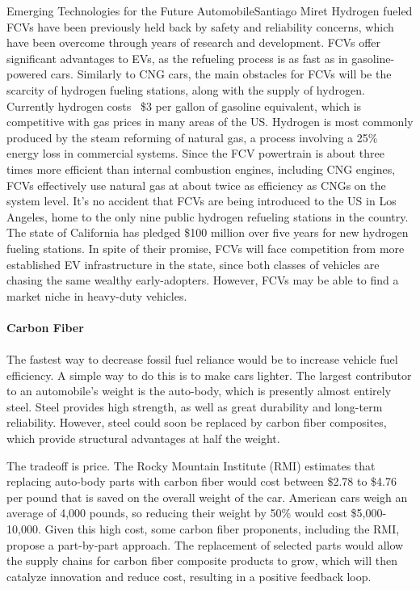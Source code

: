 \documentclass{papertex}
\begin{document}
\begin{news}{2}{Emerging Technologies for the Future Automobile}{Santiago Miret}{}{}
Hydrogen fueled FCVs have been previously held back by safety and reliability
concerns, which have been overcome through years of research and development.
FCVs offer significant advantages to EVs, as the refueling process is as fast as
in gasoline-powered cars. Similarly to CNG cars, the main obstacles for FCVs
will be the scarcity of hydrogen fueling stations, along with the supply of
hydrogen. Currently hydrogen costs ~\$3 per gallon of gasoline equivalent, which
is competitive with gas prices in many areas of the US. Hydrogen is most
commonly produced by the steam reforming of natural gas, a process involving a
25\% energy loss in commercial systems. Since the FCV powertrain is about three
times more efficient than internal combustion engines, including CNG engines,
FCVs effectively use natural gas at about twice as efficiency as CNGs on the
system level. It's no accident that FCVs are being introduced to the US in Los
Angeles, home to the only nine public hydrogen refueling stations in the
country. The state of California has pledged \$100 million over five years for
new hydrogen fueling stations. In spite of their promise, FCVs will face
competition from more established EV infrastructure in the state, since both
classes of vehicles are chasing the same wealthy early-adopters. However, FCVs
may be able to find a market niche in heavy-duty vehicles.
\\
\\
\textbf{Carbon Fiber}
\\
\\
The fastest way to decrease fossil fuel reliance would be to increase vehicle
fuel efficiency. A simple way to do this is to make cars lighter. The largest
contributor to an automobile's weight is the auto-body, which is presently
almost entirely steel. Steel provides high strength, as well as great durability
and long-term reliability. However, steel could soon be replaced by carbon fiber
composites, which provide structural advantages at half the weight.

The tradeoff is price. The Rocky Mountain Institute (RMI) estimates that
replacing auto-body parts with carbon fiber would cost between \$2.78 to \$4.76
per pound that is saved on the overall weight of the car. American cars weigh an
average of 4,000 pounds, so reducing their weight by 50\% would cost
\$5,000-10,000. Given this high cost, some carbon fiber proponents, including
the RMI, propose a part-by-part approach. The replacement of selected parts
would allow the supply chains for carbon fiber composite products to grow, which
will then catalyze innovation and reduce cost, resulting in a positive feedback
loop.


\end{news}
\end{document}
